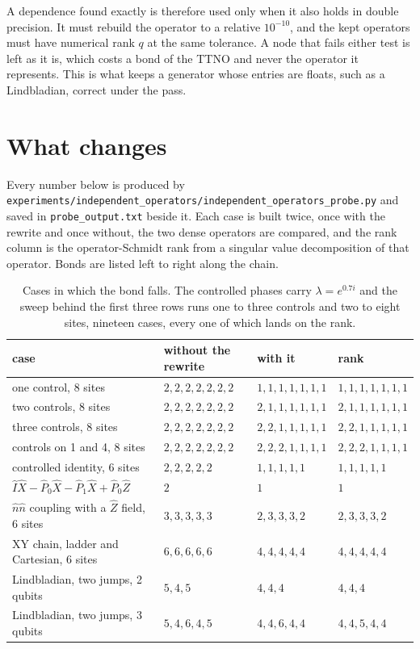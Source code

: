 \documentclass[11pt,a4paper]{article}
\newcommand{\file}[1]{\texttt{\nolinkurl{#1}}}
\begin{document}
A dependence found exactly is therefore used only when it also holds in double precision. It must
rebuild the operator to a relative $10^{-10}$, and the kept operators must have numerical rank $q$ at
the same tolerance. A node that fails either test is left as it is, which costs a bond of the TTNO
and never the operator it represents. This is what keeps a generator whose entries are floats, such
as a Lindbladian, correct under the pass.

\section{What changes}\label{sec:changes}

Every number below is produced by \file{experiments/independent_operators/independent_operators_probe.py} and saved in
\file{probe_output.txt} beside it. Each case is built twice, once with the rewrite and once without,
the two dense operators are compared, and the rank column is the operator-Schmidt rank from a
singular value decomposition of that operator. Bonds are listed left to right along the chain.

\begin{table}[htbp]
\caption{Cases in which the bond falls. The controlled phases carry $\lambda = e^{0.7i}$ and the
sweep behind the first three rows runs one to three controls and two to eight sites, nineteen cases,
every one of which lands on the rank.}
\label{tab:improved}
\centering
\small
\begin{tabular}{llll}
\toprule
case & without the rewrite & with it & rank \\
\midrule
one control, 8 sites           & $2,2,2,2,2,2,2$ & $1,1,1,1,1,1,1$ & $1,1,1,1,1,1,1$ \\
two controls, 8 sites          & $2,2,2,2,2,2,2$ & $2,1,1,1,1,1,1$ & $2,1,1,1,1,1,1$ \\
three controls, 8 sites        & $2,2,2,2,2,2,2$ & $2,2,1,1,1,1,1$ & $2,2,1,1,1,1,1$ \\
controls on 1 and 4, 8 sites   & $2,2,2,2,2,2,2$ & $2,2,2,1,1,1,1$ & $2,2,2,1,1,1,1$ \\
controlled identity, 6 sites   & $2,2,2,2,2$     & $1,1,1,1,1$     & $1,1,1,1,1$ \\
$\hat{I}\hat{X} - \hat{P}_0\hat{X} - \hat{P}_1\hat{X} + \hat{P}_0\hat{Z}$
                               & $2$             & $1$             & $1$ \\
$\hat{n}\hat{n}$ coupling with a $\hat{Z}$ field, 6 sites
                               & $3,3,3,3,3$     & $2,3,3,3,2$     & $2,3,3,3,2$ \\
XY chain, ladder and Cartesian, 6 sites
                               & $6,6,6,6,6$     & $4,4,4,4,4$     & $4,4,4,4,4$ \\
Lindbladian, two jumps, 2 qubits & $5,4,5$       & $4,4,4$         & $4,4,4$ \\
Lindbladian, two jumps, 3 qubits & $5,4,6,4,5$   & $4,4,6,4,4$     & $4,4,5,4,4$ \\
\bottomrule
\end{tabular}
\end{table}
\end{document}

